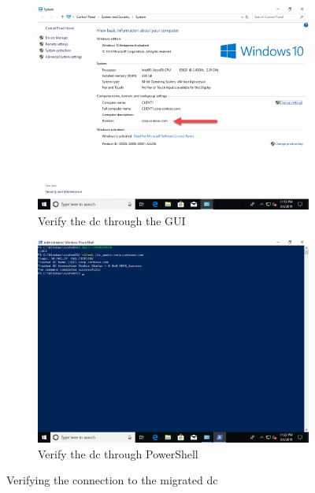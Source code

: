 \begin{figure}[h]\ContinuedFloat
	\begin{subfigure}{0.5\textwidth}
		\captionsetup{width=0.8\linewidth}
		\includegraphics[width=0.9\linewidth]{img/Methodologie/Verification2.png}
		\centering
		\caption{Verify the \acrshort{dc} through the GUI}
		\label{fig:verification2}
	\end{subfigure}
	\begin{subfigure}{0.5\textwidth}
		\captionsetup{width=0.8\linewidth}
		\includegraphics[width=0.9\linewidth]{img/Methodologie/Verification3.png} 
		\centering
		\caption{Verify the \acrshort{dc} through PowerShell}
		\label{fig:verification3}
	\end{subfigure}
	\caption{Verifying the connection to the migrated \acrshort{dc}}
	\label{fig:verification}
\end{figure}
\clearpage

